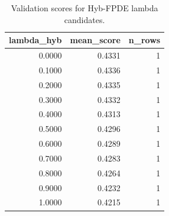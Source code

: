 \begin{table}[t]
\caption{Validation scores for Hyb-FPDE lambda candidates.}
\label{tab:lambda_distribution_computed}
\centering
\begin{tabular}{rrr}
\toprule
lambda\_hyb & mean\_score & n\_rows \\
\midrule
0.0000 & 0.4331 & 1 \\
0.1000 & 0.4336 & 1 \\
0.2000 & 0.4335 & 1 \\
0.3000 & 0.4332 & 1 \\
0.4000 & 0.4313 & 1 \\
0.5000 & 0.4296 & 1 \\
0.6000 & 0.4289 & 1 \\
0.7000 & 0.4283 & 1 \\
0.8000 & 0.4264 & 1 \\
0.9000 & 0.4232 & 1 \\
1.0000 & 0.4215 & 1 \\
\bottomrule
\end{tabular}

\end{table}
